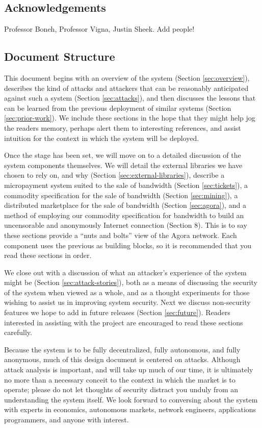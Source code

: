 \documentclass{article}
\begin{document}
\subsection{Acknowledgements}

Professor Boneh, Professor Vigna, Justin Sheek. Add people!

\subsection{Document Structure}

This document begins with an overview of the system (Section \ref{sec:overview}), describes the kind of attacks and attackers that can be reasonably anticipated against such a system (Section \ref{sec:attacks}), and then discusses the lessons that can be learned from the previous deployment of similar systems (Section \ref{sec:prior-work}). We include these sections in the hope that they might help jog the readers memory, perhaps alert them to interesting references, and assist intuition for the context in which the system will be deployed.

Once the stage has been set, we will move on to a detailed discussion of the system components themselves. We will detail the external libraries we have chosen to rely on, and why (Section \ref{sec:external-libraries}), describe a micropayment system suited to the sale of bandwidth (Section \ref{sec:tickets}), a commodity specification for the sale of bandwidth (Section \ref{sec:mining}), a distributed marketplace for the sale of bandwidth (Section \ref{sec:agora}), and a method of employing our commodity specification for bandwidth to build an uncensorable and anonymously Internet connection (Section 8). This is to say these sections provide a “nuts and bolts” view of the Agora network. Each component uses the previous as building blocks, so it is recommended that you read these sections in order.

We close out with a discussion of what an attacker's experience of the system might be (Section \ref{sec:attack-stories}), both as a means of discussing the security of the system when viewed as a whole, and as a thought experiments for those wishing to assist us in improving system security. Next we discuss non-security features we hope to add in future releases (Section \ref{sec:future}). Readers interested in assisting with the project are encouraged to read these sections carefully.

Because the system is to be fully decentralized, fully autonomous, and fully anonymous, much of this design document is centered on attacks. Although attack analysis is important, and will take up much of our time, it is ultimately no more than a necessary conceit to the context in which the market is to operate; please do not let thoughts of security distract you unduly from an understanding the system itself. We look forward to conversing about the system with experts in economics, autonomous markets, network engineers, applications programmers, and anyone with interest.
\end{document}
